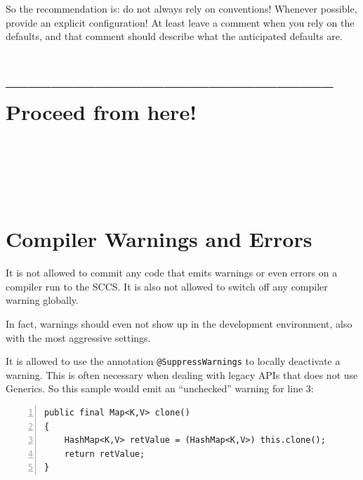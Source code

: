 \documentclass[11pt,a4paper, titlepage, parskip=half, headsepline, footsepline, cleardoublepage=current, headheight=1cm]{scrbook}
\begin{document}
So the recommendation is: do not always rely on conventions! Whenever possible, provide an explicit configuration! At least leave a comment when you rely on the defaults, and that comment should describe what the anticipated defaults are.

\section{-------------------------------------------- Proceed from here!}

\begin{lstlisting}
\end{lstlisting}

\begin{lstlisting}
\end{lstlisting}

\begin{lstlisting}
\end{lstlisting}

\begin{lstlisting}
\end{lstlisting}

\begin{lstlisting}
\end{lstlisting}

\begin{lstlisting}
\end{lstlisting}

\begin{lstlisting}
\end{lstlisting}

\section{Compiler Warnings and Errors}\label{sec:CompilerWarningsAndErrors}
It is not allowed to commit any code that emits warnings or even errors on a compiler run to the SCCS. It is also not allowed to switch off any compiler warning globally.

In fact, warnings should even not show up in the development environment, also with the most aggressive settings.

It is allowed to use the annotation \lstinline|@SuppressWarnings|\autocite{ORACLE_DOC_SUPPRESSWARNINGS_ANNOTATION} to locally deactivate a warning. This is often necessary when dealing with legacy APIs that does not use Generics. So this sample would emit an “unchecked” warning for line 3:
\begin{lstlisting}[numbers=left]
public final Map<K,V> clone()
{
    HashMap<K,V> retValue = (HashMap<K,V>) this.clone();
    return retValue;
}
\end{lstlisting}
\end{document}

